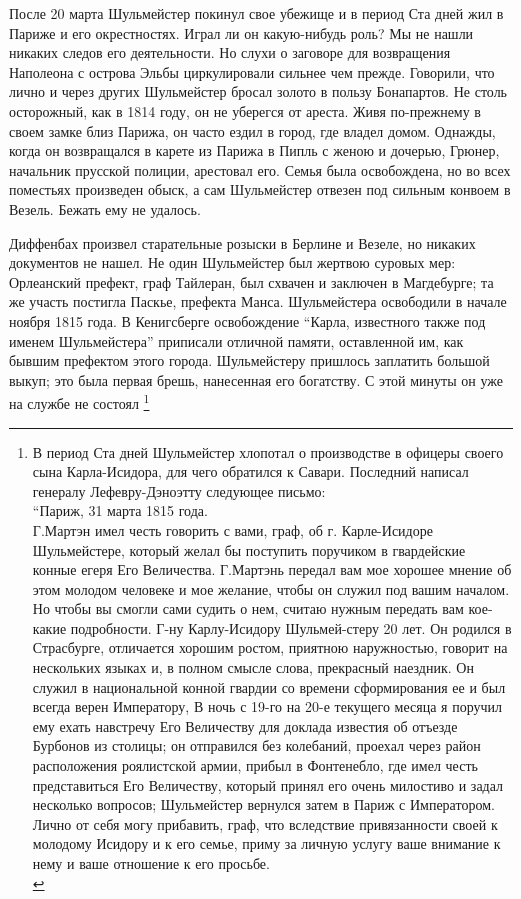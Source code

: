 \documentclass[
  oneside,
  12pt,
  titlepage]{book}
\begin{document}
После 20 марта Шульмейстер покинул свое убежище и в период Ста дней жил в Париже и его окрестностях. Играл ли он какую-нибудь роль? Мы не нашли никаких следов его деятельности. Но слухи о заговоре для возвращения Наполеона с острова Эльбы циркулировали сильнее чем прежде. Говорили, что лично и через других Шульмейстер бросал золото в пользу Бонапартов. Не столь осторожный, как в 1814 году, он не уберегся от ареста. Живя по-прежнему в своем замке близ Парижа, он часто ездил в город, где владел домом. Однажды, когда он возвращался в карете из Парижа в Пипль с женою и дочерью, Грюнер, начальник прусской полиции, арестовал его. Семья была освобождена, но во всех поместьях произведен обыск, а сам Шульмейстер отвезен под сильным конвоем в Везель. Бежать ему не удалось.

Диффенбах произвел старательные розыски в Берлине и Везеле, но никаких документов не нашел. Не один Шульмейстер был жертвою суровых мер: Орлеанский префект, граф Тайлеран, был схвачен и заключен в Магдебурге; та же участь постигла Паскье, префекта Манса. Шульмейстера освободили в начале ноября 1815 года. В Кенигсберге освобождение ``Карла, известного также под именем Шульмейстера'' приписали отличной памяти, оставленной им, как бывшим префектом этого города. Шульмейстеру пришлось заплатить большой выкуп; это была первая брешь, нанесенная его богатству. С этой минуты он уже на службе не состоял \footnote{В период Ста дней Шульмейстер хлопотал о производстве в офицеры своего сына Карла-Исидора, для чего обратился к Савари. Последний написал генералу Лефевру-Дэноэтту следующее письмо:\\
  ``Париж, 31 марта 1815 года.\\
  Г.Мартэн имел честь говорить с вами, граф, об г. Карле-Исидоре Шульмейстере, который желал бы поступить поручиком в гвардейские конные егеря Его Величества. Г.Мартэнь передал вам мое хорошее мнение об этом молодом человеке и мое желание, чтобы он служил под вашим началом. Но чтобы вы смогли сами судить о нем, считаю нужным передать вам кое-какие подробности. Г-ну Карлу-Исидору Шульмей-стеру 20 лет. Он родился в Страсбурге, отличается хорошим ростом, приятною наружностью, говорит на нескольких языках и, в полном смысле слова, прекрасный наездник. Он служил в национальной конной гвардии со времени сформирования ее и был всегда верен Императору, В ночь с 19-го на 20-е текущего месяца я поручил ему ехать навстречу Его Величеству для доклада известия об отъезде Бурбонов из столицы; он отправился без колебаний, проехал через район расположения роялистской армии, прибыл в Фонтенебло, где имел честь представиться Его Величеству, который принял его очень милостиво и задал несколько вопросов; Шульмейстер вернулся затем в Париж с Императором. Лично от себя могу прибавить, граф, что вследствие привязанности своей к молодому Исидору и к его семье, приму за личную услугу ваше внимание к нему и ваше отношение к его просьбе.\\
}
\end{document}
